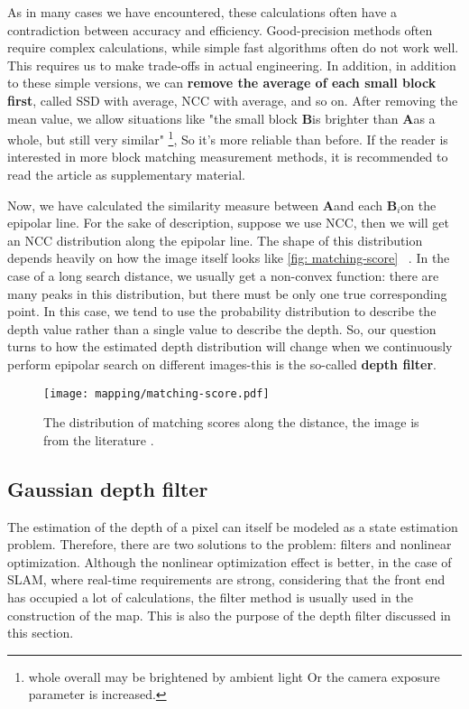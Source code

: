 As in many cases we have encountered, these calculations often have a contradiction between accuracy and efficiency. Good-precision methods often require complex calculations, while simple fast algorithms often do not work well. This requires us to make trade-offs in actual engineering. In addition, in addition to these simple versions, we can \textbf{remove the average of each small block first}, called SSD with average, NCC with average, and so on. After removing the mean value, we allow situations like "the small block $\bm{B} $is brighter than $\bm{A} $as a whole, but still very similar" \footnote{whole overall may be brightened by ambient light Or the camera exposure parameter is increased. }, So it's more reliable than before. If the reader is interested in more block matching measurement methods, it is recommended to read the article \cite{stereo-matching-website, Hirschmuller2007} as supplementary material.

Now, we have calculated the similarity measure between $\bm{A} $and each $\bm{B}_i $on the epipolar line. For the sake of description, suppose we use NCC, then we will get an NCC distribution along the epipolar line. The shape of this distribution depends heavily on how the image itself looks like \autoref{fig: matching-score} ~. In the case of a long search distance, we usually get a non-convex function: there are many peaks in this distribution, but there must be only one true corresponding point. In this case, we tend to use the probability distribution to describe the depth value rather than a single value to describe the depth. So, our question turns to how the estimated depth distribution will change when we continuously perform epipolar search on different images-this is the so-called \textbf{depth filter}.

\begin{figure}[! htp]
\centering
\texttt{[image: mapping/matching-score.pdf]}
\caption{The distribution of matching scores along the distance, the image is from the literature \cite{Vogiatzis2011}. }
\label{fig: matching-score}
\end{figure}

\subsection{Gaussian depth filter}
The estimation of the depth of a pixel can itself be modeled as a state estimation problem. Therefore, there are two solutions to the problem: filters and nonlinear optimization. Although the nonlinear optimization effect is better, in the case of SLAM, where real-time requirements are strong, considering that the front end has occupied a lot of calculations, the filter method is usually used in the construction of the map. This is also the purpose of the depth filter discussed in this section.

